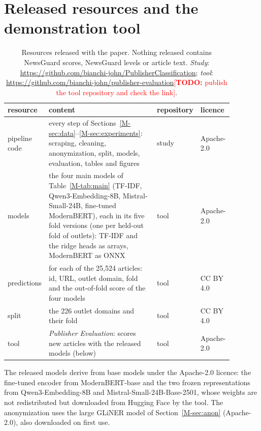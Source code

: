 \documentclass[11pt,a4paper]{article}
\newcommand{\todo}[1]{\textcolor{red}{[\textbf{TODO:} #1]}}
\begin{document}
\section{Released resources and the demonstration tool}\label{app:tool}
\begin{table}[t]
\centering\small
\caption{Resources released with the paper. Nothing released contains NewsGuard scores, NewsGuard levels or article
text. \emph{Study}: \url{https://github.com/bianchi-john/PublisherClassification}; \emph{tool}:
\url{https://github.com/bianchi-john/publisher-evaluation}\todo{publish the tool repository and check the
link}.}\label{tab:release}
\begin{tabular}{p{0.15\linewidth}p{0.50\linewidth}p{0.11\linewidth}p{0.12\linewidth}}
\toprule
resource & content & repository & licence \\
\midrule
pipeline code & every step of Sections~\ref{M-sec:data}--\ref{M-sec:experiments}: scraping, cleaning, anonymization,
  split, models, evaluation, tables and figures & study & Apache-2.0 \\
models & the four main models of Table~\ref{M-tab:main} (TF-IDF, Qwen3-Embedding-8B, Mistral-Small-24B,
  fine-tuned ModernBERT), each in its five fold versions (one per held-out fold of outlets):
  TF-IDF and the ridge heads as arrays, ModernBERT as ONNX & tool & Apache-2.0 \\
predictions & for each of the 25,524 articles: id, URL, outlet domain, fold and the out-of-fold score of the four
  models & tool & CC BY 4.0 \\
split & the 226 outlet domains and their fold & tool & CC BY 4.0 \\
tool & \emph{Publisher Evaluation}: scores new articles with the released models (below) & tool & Apache-2.0 \\
\bottomrule
\end{tabular}
\end{table}

The released models derive from base models under the Apache-2.0 licence: the fine-tuned encoder from ModernBERT-base
and the two frozen representations from Qwen3-Embedding-8B and Mistral-Small-24B-Base-2501, whose weights are not
redistributed but downloaded from Hugging Face by the tool. The anonymization uses the large GLiNER model of
Section~\ref{M-sec:anon} (Apache-2.0), also downloaded on first use.
\end{document}
